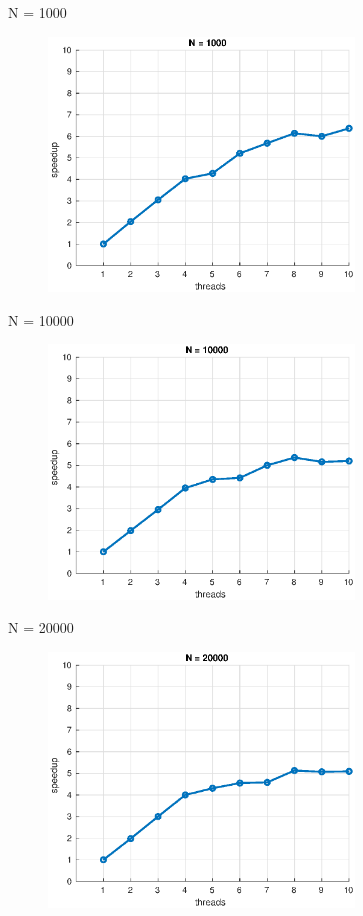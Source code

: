 \documentclass{beamer}
\begin{document}
\begin{frame}{N = 1000}

\begin{figure}[H]
\centering
\includegraphics[width=3.2in]{../Paper/fig/speedup1000.eps}
\end{figure}

\end{frame}


\begin{frame}{N = 10000}

\begin{figure}[H]
\centering
\includegraphics[width=3.2in]{../Paper/fig/speedup10000.eps}
\end{figure}

\end{frame}


\begin{frame}{N = 20000}

\begin{figure}[H]
\centering
\includegraphics[width=3.2in]{../Paper/fig/speedup20000.eps}
\end{figure}

\end{frame}
\end{document}
